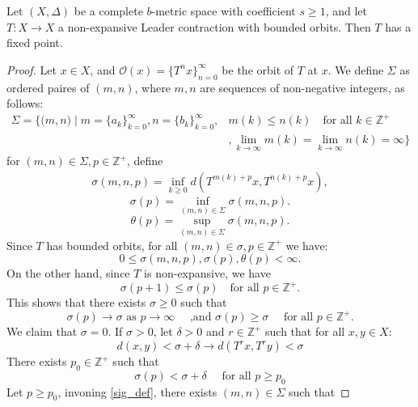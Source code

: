 \documentclass[10pt,a4paper]{amsart}
\begin{document}
\begin{thm}\label{thm_leader}
Let $(X,\Delta)$ be a complete $b$-metric space with coefficient $s\geq 1$, and let $T:X\to X$ a non-expansive Leader contraction with bounded orbits. Then $T$ has a fixed point. 
\end{thm}

\begin{proof}Let $x\in X$, and $\mathcal{O}(x) =\{T^{n}x\}_{n=0}^{\infty}$ be the orbit of $T$ at $x$. We define $\Sigma$ as ordered paires of $(m,n)$, where $m,n$ are sequences of non-negative integers, as follows: 
\begin{equation}
 \begin{aligned}
    \Sigma = \Big\{ 
        \big( m, n \big) \;\big|\;
           m=\{a_k\}_{k=0}^{\infty}, n=\{b_k\}_{k=0}^{\infty}, &  m(k)\leq n(k)\quad\text{for all }k\in \mathbb{Z}^{+}\\
 & ,\lim_{k\to\infty} m(k) = \lim_{k\to\infty} n(k) = \infty
          \Big\}
  \end{aligned}
\end{equation}
for $(m,n)\in \Sigma, p\in \mathbb{Z}^{+}$, define
\begin{align}\label{sig_inf}
\sigma(m,n,p) = \inf_{k\geq 0}d(T^{m(k)+p}x,T^{n(k)+p}x),
\end{align}
\begin{equation}\label{sig_def}
\sigma(p) = \inf_{(m,n)\in \Sigma}\sigma(m,n,p).
\end{equation}
\begin{equation}\label{theta_sup}
\theta(p) = \sup_{(m,n)\in \Sigma}\sigma(m,n,p).
\end{equation}
Since $T$ has bounded orbits, for all $(m,n)\in \sigma, p\in \mathbb{Z}^{+} $ we have:
\[
0\le \sigma(m,n,p), \sigma(p),\theta(p)<\infty.
\]
 On the other hand, since $T$ is non-expansive, we have
\[
\sigma(p+1)\leq \sigma(p)\quad \text{for all }p\in \mathbb{Z}^{+}.
\]
This shows that there exists $\sigma\geq 0$ such that 
\[
\sigma(p)\to \sigma \text{ as }p\to \infty\quad\text{ ,and }\sigma(p)\geq  \sigma\quad\text{ for all }p\in \mathbb{Z}^{+}.
\]
We claim that $\sigma =0$. If $\sigma>0$, let $\delta>0$ and $r\in \mathbb{Z}^{+}$ such that for all $x,y\in X$:
\begin{equation}\label{leader_delta}
d(x,y)<\sigma+\delta\rightarrow d(T^{r}x,T^{r}y) <  \sigma
\end{equation}
There exists $p_0\in \mathbb{Z}^{+}$ such that
\[
\sigma(p)<\sigma+\delta\quad\text{ for all }p\ge p_0
\]
Let $p\ge p_{0}$, invoning \eqref{sig_def}, there exists $(m,n)\in \Sigma$ such that

\end{proof}
\end{document}
